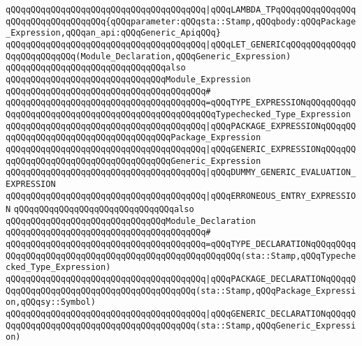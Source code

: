 \verb|qQQqqQQqqQQqqQQqqQQqqQQqqQQqqQQqqQQqqQQq|\verb#|qQQqLAMBDA_TPqQQqqQQqqQQqqQQqqQQqqQQqqQQqqQQqqQQq{qQQqparameter:qQQqsta::Stamp,qQQqbody:qQQqPackage_Expression,qQQqan_api:qQQqGeneric_ApiqQQq}#\newline
\verb|qQQqqQQqqQQqqQQqqQQqqQQqqQQqqQQqqQQqqQQq|\verb#|qQQqLET_GENERICqQQqqQQqqQQqqQQqqQQqqQQqqQQq(Module_Declaration,qQQqGeneric_Expression)#\newline
\newline
\newline
\newline
\verb|qQQqqQQqqQQqqQQqqQQqqQQqqQQqqQQqalso|\newline
\verb|qQQqqQQqqQQqqQQqqQQqqQQqqQQqqQQqModule_Expression|\newline
\verb|qQQqqQQqqQQqqQQqqQQqqQQqqQQqqQQqqQQqqQQq#|\newline
\verb|qQQqqQQqqQQqqQQqqQQqqQQqqQQqqQQqqQQqqQQq=qQQqTYPE_EXPRESSIONqQQqqQQqqQQqqQQqqQQqqQQqqQQqqQQqqQQqqQQqqQQqqQQqqQQqTypechecked_Type_Expression|\newline
\verb|qQQqqQQqqQQqqQQqqQQqqQQqqQQqqQQqqQQqqQQq|\verb#|qQQqPACKAGE_EXPRESSIONqQQqqQQqqQQqqQQqqQQqqQQqqQQqqQQqqQQqqQQqPackage_Expression#\newline
\verb|qQQqqQQqqQQqqQQqqQQqqQQqqQQqqQQqqQQqqQQq|\verb#|qQQqGENERIC_EXPRESSIONqQQqqQQqqQQqqQQqqQQqqQQqqQQqqQQqqQQqqQQqGeneric_Expression#\newline
\verb|qQQqqQQqqQQqqQQqqQQqqQQqqQQqqQQqqQQqqQQq|\verb#|qQQqDUMMY_GENERIC_EVALUATION_EXPRESSION#\newline
\verb|qQQqqQQqqQQqqQQqqQQqqQQqqQQqqQQqqQQqqQQq|\verb#|qQQqERRONEOUS_ENTRY_EXPRESSION#\newline
\newline
\newline
\newline
\verb|qQQqqQQqqQQqqQQqqQQqqQQqqQQqqQQqalso|\newline
\verb|qQQqqQQqqQQqqQQqqQQqqQQqqQQqqQQqModule_Declaration|\newline
\verb|qQQqqQQqqQQqqQQqqQQqqQQqqQQqqQQqqQQqqQQq#|\newline
\verb|qQQqqQQqqQQqqQQqqQQqqQQqqQQqqQQqqQQqqQQq=qQQqTYPE_DECLARATIONqQQqqQQqqQQqqQQqqQQqqQQqqQQqqQQqqQQqqQQqqQQqqQQqqQQqqQQq(sta::Stamp,qQQqTypechecked_Type_Expression)|\newline
\verb|qQQqqQQqqQQqqQQqqQQqqQQqqQQqqQQqqQQqqQQq|\verb#|qQQqPACKAGE_DECLARATIONqQQqqQQqqQQqqQQqqQQqqQQqqQQqqQQqqQQqqQQqqQQq(sta::Stamp,qQQqPackage_Expression,qQQqsy::Symbol)#\newline
\verb|qQQqqQQqqQQqqQQqqQQqqQQqqQQqqQQqqQQqqQQq|\verb#|qQQqGENERIC_DECLARATIONqQQqqQQqqQQqqQQqqQQqqQQqqQQqqQQqqQQqqQQqqQQq(sta::Stamp,qQQqGeneric_Expression)#\newline

